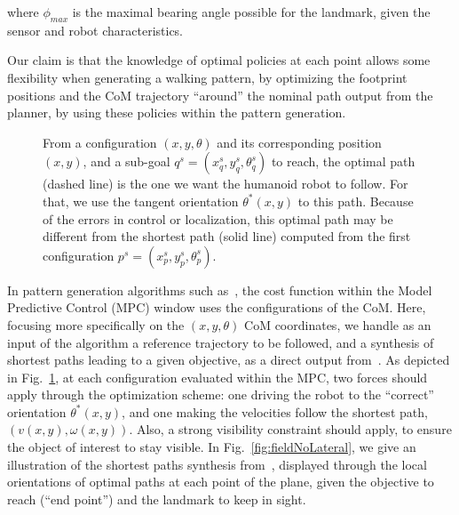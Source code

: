 where $\phi_{max}$ is the maximal bearing angle possible for the landmark, given the sensor and robot characteristics.

Our claim is that the knowledge of optimal policies at each point allows some flexibility when generating a walking pattern, by optimizing the footprint positions and  the CoM trajectory ``around'' the nominal path output from the planner, by using these policies within the pattern generation.

\begin{figure}

\caption{From a configuration $(x,y,\theta)$ and its corresponding position $(x,y)$, and a sub-goal $q^s= (x_q^s,y_q^s,\theta_q^s)$ to reach, the optimal path (dashed line) is the one we want the humanoid robot to follow. For that, we use the tangent orientation $\theta^*(x,y)$ to this path. Because of the errors in control or localization, this optimal path may be different from the shortest path (solid line) computed from the first configuration $p^s= (x_p^s,y_p^s,\theta_p^s)$.
\label{fig:paths}}
\end{figure}

In pattern generation algorithms such as~\cite{HerdtAR2010}, the cost function within the Model Predictive Control (MPC) window uses the configurations of the CoM. Here, focusing more specifically on the $(x,y,\theta)$ CoM coordinates, we handle as an input of the algorithm a reference trajectory to be followed, and a synthesis of shortest paths leading to a given objective, as a direct output from~\cite{Salaris:2010}. As depicted in Fig.~\ref{fig:paths}, at each configuration evaluated within the MPC, two forces should apply through the optimization scheme: one driving the robot to the ``correct'' orientation $\theta^*(x,y)$, and one making the velocities follow the shortest path, $(v(x,y),\omega(x,y))$. Also, a strong visibility constraint should apply, to ensure the object of interest to stay visible. In Fig.~\ref{fig:fieldNoLateral}, we give an illustration of the shortest paths synthesis from~\cite{Salaris:2010}, displayed through the local orientations of optimal paths at each point of the plane, given the objective to reach (``end point'') and the landmark to keep in sight. 



